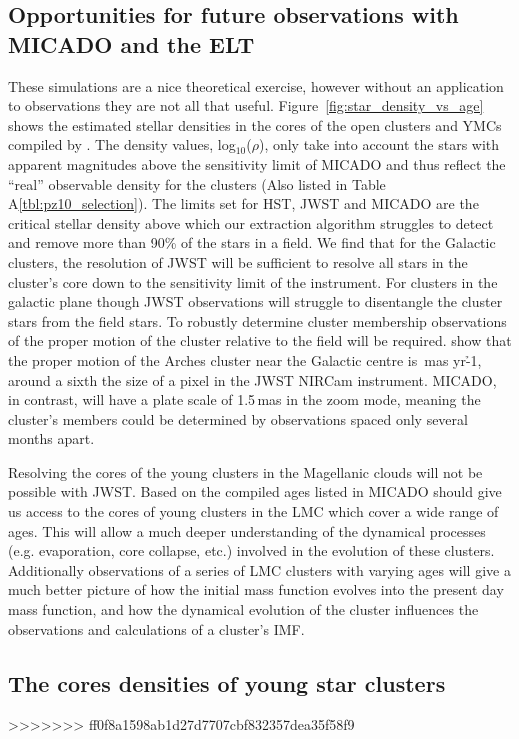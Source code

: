 \subsection{Opportunities for future observations with MICADO and the ELT}

These simulations are a nice theoretical exercise, however without an
application to observations they are not all that useful.
Figure~\ref{fig:star_density_vs_age} shows the estimated stellar densities in
the cores of the open clusters and YMCs compiled by \citet{portegies2010}. The
density values, log$_{10}$($\rho$), only take into account the stars with
apparent magnitudes above the sensitivity limit of MICADO and thus reflect the
``real'' observable density for the clusters (Also listed in Table
A\ref{tbl:pz10_selection}). The limits set for HST, JWST and MICADO are the
critical stellar density above which our extraction algorithm struggles to
detect and remove more than 90\% of the stars in a field. We find that for the
Galactic clusters, the resolution of JWST will be sufficient to resolve all
stars in the cluster's core down to the sensitivity limit of the instrument.
For clusters in the galactic plane though JWST observations will struggle to
disentangle the cluster stars from the field stars. To robustly determine
cluster membership observations of the proper motion of the cluster relative to
the field will be required. \citet{stolte2008} show that the proper motion of
the Arches cluster near the Galactic centre is \,mas yr\h{-1}, around a
sixth the size of a pixel in the JWST NIRCam instrument. MICADO, in contrast,
will have a plate scale of 1.5\,mas in the zoom mode, meaning the cluster's
members could be determined by observations spaced only several months apart.

Resolving the cores of the young clusters in the Magellanic clouds will not be
possible with JWST. Based on the compiled ages listed in \citet{portegies2010}
MICADO should give us access to the cores of young clusters in the LMC which
cover a wide range of ages. This will allow a much deeper understanding of the
dynamical processes (e.g. evaporation, core collapse, etc.) involved in the
evolution of these clusters. Additionally observations of a series of LMC
clusters with varying ages will give a much better picture of how the initial
mass function evolves into the present day mass function, and how the dynamical
evolution of the cluster influences the observations and calculations of a
cluster's IMF.


\subsection{The cores densities of young star clusters}
>>>>>>> ff0f8a1598ab1d27d7707cbf832357dea35f58f9

